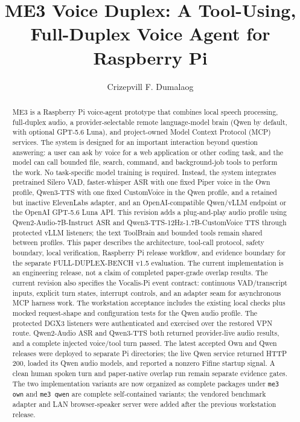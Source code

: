 \documentclass[sigconf,nonacm]{acmart}
\title{ME3 Voice Duplex: A Tool-Using, Full-Duplex Voice Agent for Raspberry Pi}
\author{Crizepvill F. Dumalaog}
\affiliation{\institution{Mapua University}\department{Master of Engineering in Artificial Intelligence}\city{Manila}\country{Philippines}}
\begin{document}
\begin{abstract}
ME3 is a Raspberry Pi voice-agent prototype that combines local speech processing,
full-duplex audio, a provider-selectable remote language-model brain (Qwen by
default, with optional GPT-5.6 Luna), and project-owned Model
Context Protocol (MCP) services. The system is designed for an important
interaction beyond question answering: a user can ask by voice for a web
application or other coding task, and the model can call bounded file, search,
command, and background-job tools to perform the work. No task-specific model
training is required. Instead, the system integrates pretrained Silero VAD,
faster-whisper ASR with one fixed Piper voice in the Own profile, Qwen3-TTS
with one fixed CustomVoice in the Qwen profile, and a retained but inactive
ElevenLabs adapter, and
an OpenAI-compatible Qwen/vLLM endpoint or the OpenAI GPT-5.6 Luna API. This
revision adds a plug-and-play audio profile using Qwen2-Audio-7B-Instruct ASR
and Qwen3-TTS-12Hz-1.7B-CustomVoice TTS through protected vLLM listeners; the
text ToolBrain and bounded tools remain shared between profiles.
This paper describes the architecture, tool-call protocol, safety boundary,
local verification, Raspberry Pi release workflow, and evidence boundary for
the separate FULL-DUPLEX-BENCH v1.5 evaluation. The current implementation is
an engineering release, not a claim of completed paper-grade overlap results.
The current revision also specifies the Vocalis-Pi event contract: continuous
VAD/transcript inputs, explicit turn states, interrupt controls, and an
adapter seam for asynchronous MCP harness work. The workstation acceptance
includes the existing local checks plus mocked request-shape and configuration
tests for the Qwen audio profile. The protected DGX3 listeners were
authenticated and exercised over the restored VPN route. Qwen2-Audio ASR and
Qwen3-TTS both returned provider-live audio results, and a complete injected
voice/tool turn passed. The latest accepted Own and Qwen releases were deployed
to separate Pi directories; the live Qwen service returned HTTP 200, loaded its
Qwen audio models, and reported a nonzero Fifine startup signal. A clean human
spoken turn and paper-native overlap run remain separate evidence gates. The
two implementation variants are now organized as complete packages under
\texttt{me3 own} and \texttt{me3 qwen} are complete self-contained variants;
the vendored benchmark adapter
and LAN browser-speaker server were added after the previous workstation
release.
\end{abstract}
\end{document}
